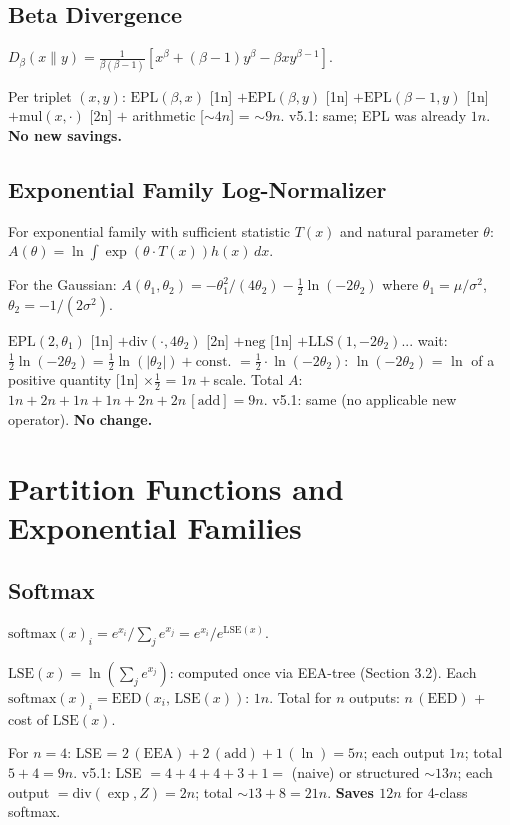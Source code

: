 \documentclass[11pt]{article}
\begin{document}
\subsection{Beta Divergence}

$D_\beta(x\|y)=\frac{1}{\beta(\beta-1)}\!\left[x^\beta+(\beta-1)y^\beta - \beta x y^{\beta-1}\right]$.

Per triplet $(x,y)$:
$\mathrm{EPL}(\beta,x)$ [1n] $+\mathrm{EPL}(\beta,y)$ [1n] $+\mathrm{EPL}(\beta-1,y)$ [1n]
$+\mathrm{mul}(x,\cdot)$ [2n] $+$ arithmetic [$\sim4n$] = $\sim9n$.
v5.1: same; EPL was already $1n$. \textbf{No new savings.}

\subsection{Exponential Family Log-Normalizer}

For exponential family with sufficient statistic $T(x)$ and natural parameter $\theta$:
$A(\theta)=\ln\int\exp(\theta\cdot T(x))h(x)\,dx$.

For the Gaussian: $A(\theta_1,\theta_2)=-\theta_1^2/(4\theta_2)-\tfrac12\ln(-2\theta_2)$
where $\theta_1=\mu/\sigma^2$, $\theta_2=-1/(2\sigma^2)$.

$\mathrm{EPL}(2,\theta_1)$ [1n] $+\mathrm{div}(\cdot,4\theta_2)$ [2n]
$+\mathrm{neg}$ [1n] $+\mathrm{LLS}(1,-2\theta_2)$... wait: $\tfrac12\ln(-2\theta_2)=\tfrac12\ln(|\theta_2|)+\text{const}$.
$= \tfrac12\cdot\ln(-2\theta_2)$: $\ln(-2\theta_2)$ = $\ln$ of a positive quantity [1n] $\times\tfrac12$ = $1n+$scale.
Total $A$: $1n+2n+1n+1n+2n+2n\,[\mathrm{add}]=9n$.
v5.1: same (no applicable new operator). \textbf{No change.}

\section{Partition Functions and Exponential Families}

\subsection{Softmax}

$\mathrm{softmax}(x)_i=e^{x_i}/\sum_j e^{x_j}=e^{x_i}/e^{\mathrm{LSE}(x)}$.

$\mathrm{LSE}(x)=\ln(\sum_j e^{x_j})$: computed once via EEA-tree (Section 3.2).
Each $\mathrm{softmax}(x)_i=\mathrm{EED}(x_i,\,\mathrm{LSE}(x))$: $1n$.
Total for $n$ outputs: $n\,(\mathrm{EED})$ + cost of $\mathrm{LSE}(x)$.

For $n=4$: LSE = $2\,(\mathrm{EEA})+2\,(\mathrm{add})+1\,(\ln)=5n$; each output $1n$; total $5+4=9n$.
v5.1: LSE $=4+4+4+3+1=$ (naive) or structured $\sim13n$; each output $=\mathrm{div}(\exp,Z)=2n$;
total $\sim13+8=21n$. \textbf{Saves $12n$} for 4-class softmax.
\end{document}
